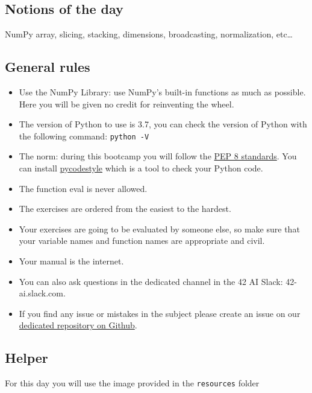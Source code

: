 \documentclass[]{article}
\begin{document}
\hypertarget{notions-of-the-day}{%
\subsection{Notions of the day}\label{notions-of-the-day}}

NumPy array, slicing, stacking, dimensions, broadcasting, normalization,
etc\ldots{}

\hypertarget{general-rules}{%
\subsection{General rules}\label{general-rules}}

\begin{itemize}
\item
  Use the NumPy Library: use NumPy's built-in functions as much as
  possible. Here you will be given no credit for reinventing the wheel.
\item
  The version of Python to use is 3.7, you can check the version of
  Python with the following command: \texttt{python\ -V}
\item
  The norm: during this bootcamp you will follow the
  \href{https://www.python.org/dev/peps/pep-0008/}{PEP 8 standards}. You
  can install \href{https://pypi.org/project/pycodestyle}{pycodestyle}
  which is a tool to check your Python code.
\item
  The function eval is never allowed.
\item
  The exercises are ordered from the easiest to the hardest.
\item
  Your exercises are going to be evaluated by someone else, so make sure
  that your variable names and function names are appropriate and civil.
\item
  Your manual is the internet.
\item
  You can also ask questions in the dedicated channel in the 42 AI
  Slack: 42-ai.slack.com.
\item
  If you find any issue or mistakes in the subject please create an
  issue on our
  \href{https://github.com/42-AI/bootcamp_python/issues}{dedicated
  repository on Github}.
\end{itemize}

\hypertarget{helper}{%
\subsection{Helper}\label{helper}}

For this day you will use the image provided in the \texttt{resources}
folder
\end{document}

